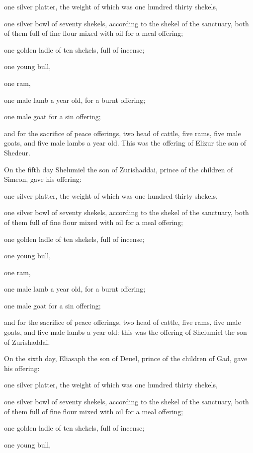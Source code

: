 one silver platter, the weight of which was one hundred thirty shekels,

one silver bowl of seventy shekels, according to the shekel of the sanctuary, both of them
full of fine flour mixed with oil for a meal offering;


\myverse{}one golden ladle of ten shekels, full of incense;


\myverse{}one young bull,

one ram,

one male lamb a year old, for a burnt offering;


\myverse{}one male goat for a sin offering;


\myverse{}and for the sacrifice of peace offerings, two head of cattle,
five rams, five male goats, and five male lambs a year old. This was the offering of Elizur the son of
Shedeur.


\myverse{}On the fifth day Shelumiel the son of Zurishaddai, prince of
the children of Simeon,
\myverse{}gave his offering:

one silver platter, the weight of which was one hundred thirty shekels,

one silver bowl of seventy shekels, according to the shekel of the sanctuary, both of them
full of fine flour mixed with oil for a meal offering;


\myverse{}one golden ladle of ten shekels, full of incense;


\myverse{}one young bull,

one ram,

one male lamb a year old, for a burnt offering;


\myverse{}one male goat for a sin offering;


\myverse{}and for the sacrifice of peace offerings, two head of cattle,
five rams, five male goats, and five male lambs a year old: this was the offering of Shelumiel the son
of Zurishaddai.


\myverse{}On the sixth day, Eliasaph the son of Deuel, prince of the children
of Gad,
\myverse{}gave his offering:

one silver platter, the weight of which was one hundred thirty shekels,

one silver bowl of seventy shekels, according to the shekel of the sanctuary, both of them
full of fine flour mixed with oil for a meal offering;


\myverse{}one golden ladle of ten shekels, full of incense;


\myverse{}one young bull,

